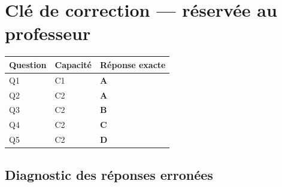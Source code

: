 \ifnxVersionProfesseur
\clearpage
\section*{Clé de correction — réservée au professeur}

\begin{center}
\begin{tabular}{lll}
\hline
Question & Capacité & Réponse exacte \\
\hline
Q1 & C1 & \textbf{A} \\
Q2 & C2 & \textbf{A} \\
Q3 & C2 & \textbf{B} \\
Q4 & C2 & \textbf{C} \\
Q5 & C2 & \textbf{D} \\
\hline
\end{tabular}
\end{center}

\subsection*{Diagnostic des réponses erronées}

